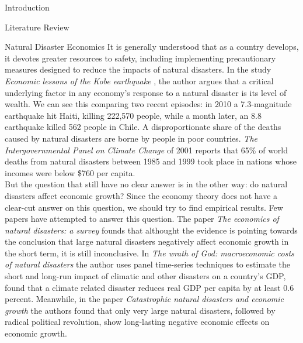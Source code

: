 \documentclass[12.5pt,fleqn,leqno,letterpaper]{article}
\begin{document}
\begin{section}{Introduction}
\begin{subsection}{Literature Review}
    \begin{subsubsection}{Natural Disaster Economics}
      It is generally understood that as a country develops, it devotes greater resources to safety, including implementing precautionary measures designed to reduce the impacts of natural disasters. In the study \textit{Economic lessons of the Kobe earthquake} \cite{horwich} , the author argues that a critical
      underlying factor in any economy's response to a natural disaster is its level of wealth. We can see this comparing two recent episodes: in 2010 a 7.3-magnitude earthquake hit Haiti, killing 222,570 people, while a month later, an 8.8 earthquake killed 562 people  in Chile. A disproportionate share of the deaths caused by natural disasters are borne by people in poor countries. \textit{The Intergovernmental Panel on Climate Change} \cite{climate} of 2001 reports that 65\% of world deaths from natural disasters between 1985 and 1999 took place in nations whose incomes were below \$760 per capita. \\
      But the question that still have no clear answer is in the other way: do natural disasters affect economic growth? Since the economy theory  does not have a clear-cut answer on this question, we should try to find empirical results. Few papers have attempted to answer this question. The paper \textit{The economics of natural disasters: a survey} \cite{cavallo} founds that althought the evidence is pointing towards the conclusion that large natural disasters negatively affect economic growth in the short term, it is still inconclusive. In \textit{The wrath of God: macroeconomic costs of natural disasters} \cite{raddatz} the author uses panel time-series techniques to estimate the short and long-run impact of climatic and other disasters on a country's GDP, found that a climate related disaster reduces real GDP per capita by at least 0.6 percent. Meanwhile, in the paper \textit{Catastrophic natural disasters and economic growth} \cite{cavallo2} the authors found that only very large natural disasters, followed by radical political revolution, show long-lasting negative economic effects on economic growth.
    \end{subsubsection}

  \end{subsection}

\end{section}
\end{document}
